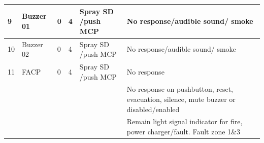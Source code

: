 \begin{table}[!h]
{\begin{tabular}{l|l|l|l|p{5cm}|p{5cm}}
			\hline
			9 & Buzzer 01 & 0 & 4 & Spray SD /push MCP & No response/audible sound/ smoke  \\ 
			\hline
			10 & Buzzer 02 & 0 & 4 & Spray SD /push MCP & No response/audible sound/ smoke  \\ 
			\hline
			11 & FACP & 0 & 4 & Spray SD /push MCP & No response \\ 
			&  &  &  &  & No response on pushbutton, reset, evacuation, silence, mute buzzer or disabled/enabled \\ 
			&  &  &  &  & Remain light signal indicator for fire, power charger/fault. Fault zone 1\&3 \\ 
			\hline
		\end{tabular}
		
	}
\end{table}



